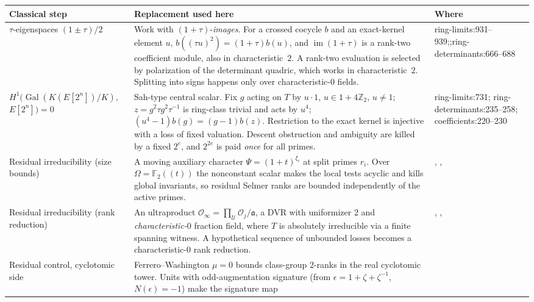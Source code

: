 \documentclass[11pt]{article}
\theoremstyle{remark}
\newcommand{\Z}{\mathbb Z}
\newcommand{\F}{\mathbb F}
\newcommand{\cO}{\mathcal O}
\DeclareMathOperator{\Gal}{Gal}
\newcommand{\src}[2]{\textsf{\small #1:#2}}
\begin{document}
{\small
\renewcommand{\arraystretch}{1.2}\begin{longtable}{@{}P{0.25\textwidth}P{0.49\textwidth}P{0.19\textwidth}@{}}
\toprule
Classical step & Replacement used here & Where \\
\midrule
\endhead
$\tau$-eigenspaces $(1\pm\tau)/2$ &
 Work with $(1+\tau)$-\emph{images}. For a crossed cocycle $b$ and an
 exact-kernel element $u$, $b((\tau u)^2)=(1+\tau)b(u)$, and
 $\operatorname{im}(1+\tau)$ is a rank-two coefficient module, also in
 characteristic~$2$. A rank-two evaluation is selected by polarization of
 the determinant quadric, which works in characteristic~$2$. Splitting
 into signs happens only over characteristic-$0$ fields. &
 \src{ring-limits}{931--939};\newline {};\newline \src{ring-determinants}{666--688} \\
$H^1(\Gal(K(E[2^n])/K),$\newline $E[2^n])=0$ &
 Sah-type central scalar. Fix $g$ acting on $T$ by $u\cdot1$,
 $u\in1+4\Z_2$, $u\ne1$; $z=g^2\tau g^2\tau^{-1}$ is ring-class trivial and
 acts by $u^4$; $(u^4-1)b(g)=(g-1)b(z)$. Restriction to the exact kernel
 is injective with a loss of fixed valuation. Descent obstruction and
 ambiguity are killed by a fixed $2^e$, and $2^{2e}$ is paid \emph{once} for
 all primes. &
  \src{ring-limits}{731}; \src{ring-determinants}{235--258}; \src{coefficients}{220--230} \\
Residual irreducibility (size bounds) &
 A moving auxiliary character $\Psi=(1+t)^{\xi_i}$ at split primes $r_i$.
 Over $\Omega=\F_2((t))$ the nonconstant scalar makes the local tests acyclic
 and kills global invariants, so residual Selmer ranks are bounded
 independently of the active primes. &
 , ,  \\
Residual irreducibility (rank reduction) &
 An ultraproduct $\cO_\infty=\prod_{\mathcal U}\cO_j/\mathfrak a$, a DVR with
 uniformizer $2$ and \emph{characteristic-$0$} fraction field, where
 $T$ is absolutely irreducible via a finite spanning witness. A hypothetical
 sequence of unbounded losses becomes a characteristic-$0$ rank reduction. &
 , ,  \\
Residual control, cyclotomic side &
 Ferrero--Washington $\mu=0$ bounds class-group $2$-ranks in the real
 cyclotomic tower. Units with odd-augmentation signature (from
 $\epsilon=1+\zeta+\zeta^{-1}$, $N(\epsilon)=-1$) make the signature map

\end{longtable}}
\end{document}
